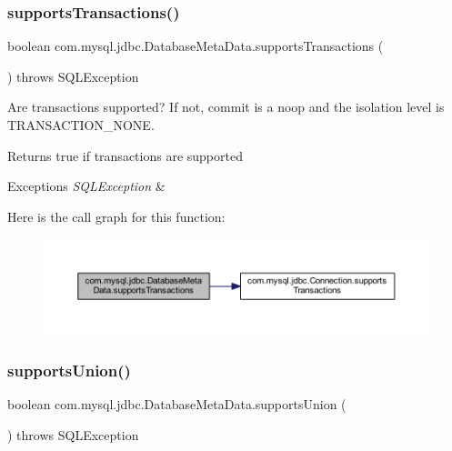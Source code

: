 \subsubsection{\texorpdfstring{supports\+Transactions()}{supportsTransactions()}}
{\footnotesize\ttfamily boolean com.\+mysql.\+jdbc.\+Database\+Meta\+Data.\+supports\+Transactions (\begin{DoxyParamCaption}{ }\end{DoxyParamCaption}) throws S\+Q\+L\+Exception}

Are transactions supported? If not, commit is a noop and the isolation level is T\+R\+A\+N\+S\+A\+C\+T\+I\+O\+N\+\_\+\+N\+O\+NE.

\begin{DoxyReturn}{Returns}
true if transactions are supported 
\end{DoxyReturn}

\begin{DoxyExceptions}{Exceptions}
{\em S\+Q\+L\+Exception} & \\
\hline
\end{DoxyExceptions}
Here is the call graph for this function\+:
\nopagebreak
\begin{figure}[H]
\begin{center}
\leavevmode
\includegraphics[width=350pt]{classcom_1_1mysql_1_1jdbc_1_1_database_meta_data_a289cac917f19975c023dc68f8a7ae559_cgraph}
\end{center}
\end{figure}
\mbox{\label{classcom_1_1mysql_1_1jdbc_1_1_database_meta_data_ada9b430a38cf202e873a20eeb93613d2}} 
\subsubsection{\texorpdfstring{supports\+Union()}{supportsUnion()}}
{\footnotesize\ttfamily boolean com.\+mysql.\+jdbc.\+Database\+Meta\+Data.\+supports\+Union (\begin{DoxyParamCaption}{ }\end{DoxyParamCaption}) throws S\+Q\+L\+Exception}

